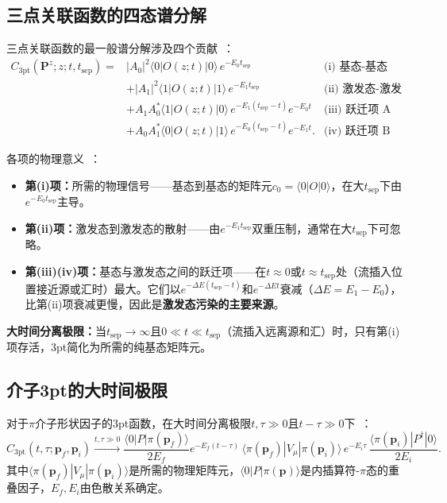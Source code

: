\documentclass[12pt,a4paper]{ctexart}
\theoremstyle{definition}
\begin{document}
\subsection{三点关联函数的四态谱分解}

三点关联函数的最一般谱分解涉及四个贡献~\cite{correlationFunctions2026}：
\begin{equation}\label{eq:spectral_decomp}
\begin{aligned}
    C_{3\text{pt}}(\mathbf{P}^z; z; t, t_{\text{sep}}) =&
    |A_0|^2 \langle 0|O(z;t)|0\rangle\, e^{-E_0 t_{\text{sep}}} & \text{(i) 基态-基态（信号）} \\
    &+ |A_1|^2 \langle 1|O(z;t)|1\rangle\, e^{-E_1 t_{\text{sep}}} & \text{(ii) 激发态-激发态（散射）} \\
    &+ A_1 A_0^* \langle 1|O(z;t)|0\rangle\, e^{-E_1(t_{\text{sep}}-t)} e^{-E_0 t} & \text{(iii) 跃迁项 A} \\
    &+ A_0 A_1^* \langle 0|O(z;t)|1\rangle\, e^{-E_0(t_{\text{sep}}-t)} e^{-E_1 t}. & \text{(iv) 跃迁项 B}
\end{aligned}
\end{equation}

各项的物理意义~\cite{correlationFunctions2026}：
\begin{itemize}[leftmargin=*]
    \item \textbf{第(i)项：}所需的物理信号——基态到基态的矩阵元$c_0 = \langle 0|O|0\rangle$，在大$t_{\text{sep}}$下由$e^{-E_0 t_{\text{sep}}}$主导。
    \item \textbf{第(ii)项：}激发态到激发态的散射——由$e^{-E_1 t_{\text{sep}}}$双重压制，通常在大$t_{\text{sep}}$下可忽略。
    \item \textbf{第(iii)(iv)项：}基态与激发态之间的跃迁项——在$t \approx 0$或$t \approx t_{\text{sep}}$处（流插入位置接近源或汇时）最大。它们以$e^{-\Delta E(t_{\text{sep}}-t)}$和$e^{-\Delta E t}$衰减（$\Delta E = E_1 - E_0$），比第(ii)项衰减更慢，因此是\textbf{激发态污染的主要来源}。
\end{itemize}

\textbf{大时间分离极限：}当$t_{\text{sep}} \to \infty$且$0 \ll t \ll t_{\text{sep}}$（流插入远离源和汇）时，只有第(i)项存活，3pt简化为所需的纯基态矩阵元。

\subsection{介子3pt的大时间极限}

对于$\pi$介子形状因子的3pt函数，在大时间分离极限$t, \tau \gg 0$且$t-\tau \gg 0$下~\cite{GattringerLang2010,formFactors2026}：
\begin{equation}\label{eq:pion_3pt_limit}
    C_{3\text{pt}}(t,\tau;\mathbf{p}_f,\mathbf{p}_i) \xrightarrow{t,\tau \gg 0}
    \frac{\langle 0|P|\pi(\mathbf{p}_f)\rangle}{2E_f} e^{-E_f(t-\tau)}\,
    \langle\pi(\mathbf{p}_f)|V_\mu|\pi(\mathbf{p}_i)\rangle\,
    e^{-E_i\tau}\,
    \frac{\langle\pi(\mathbf{p}_i)|P^\dagger|0\rangle}{2E_i}.
\end{equation}
其中$\langle\pi(\mathbf{p}_f)|V_\mu|\pi(\mathbf{p}_i)\rangle$是所需的物理矩阵元，$\langle 0|P|\pi(\mathbf{p})\rangle$是内插算符-$\pi$态的重叠因子，$E_f, E_i$由色散关系确定。
\end{document}

